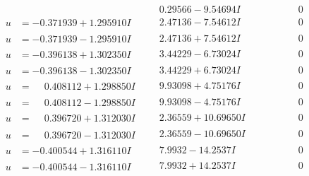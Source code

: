 \documentclass[1p]{elsarticle_modified}
\theoremstyle{definition}
\begin{document}
$$\begin{array}{c|c|c}
 & \phantom{-}0.29566 - 9.54694 I & \phantom{-0.000000 } 0 \\ \hline\begin{aligned}
u &= -0.371939 + 1.295910 I\end{aligned}
 & \phantom{-}2.47136 - 7.54612 I & \phantom{-0.000000 } 0 \\ \hline\begin{aligned}
u &= -0.371939 - 1.295910 I\end{aligned}
 & \phantom{-}2.47136 + 7.54612 I & \phantom{-0.000000 } 0 \\ \hline\begin{aligned}
u &= -0.396138 + 1.302350 I\end{aligned}
 & \phantom{-}3.44229 - 6.73024 I & \phantom{-0.000000 } 0 \\ \hline\begin{aligned}
u &= -0.396138 - 1.302350 I\end{aligned}
 & \phantom{-}3.44229 + 6.73024 I & \phantom{-0.000000 } 0 \\ \hline\begin{aligned}
u &= \phantom{-}0.408112 + 1.298850 I\end{aligned}
 & \phantom{-}9.93098 + 4.75176 I & \phantom{-0.000000 } 0 \\ \hline\begin{aligned}
u &= \phantom{-}0.408112 - 1.298850 I\end{aligned}
 & \phantom{-}9.93098 - 4.75176 I & \phantom{-0.000000 } 0 \\ \hline\begin{aligned}
u &= \phantom{-}0.396720 + 1.312030 I\end{aligned}
 & \phantom{-}2.36559 + 10.69650 I & \phantom{-0.000000 } 0 \\ \hline\begin{aligned}
u &= \phantom{-}0.396720 - 1.312030 I\end{aligned}
 & \phantom{-}2.36559 - 10.69650 I & \phantom{-0.000000 } 0 \\ \hline\begin{aligned}
u &= -0.400544 + 1.316110 I\end{aligned}
 & \phantom{-}7.9932 - 14.2537 I & \phantom{-0.000000 } 0 \\ \hline\begin{aligned}
u &= -0.400544 - 1.316110 I\end{aligned}
 & \phantom{-}7.9932 + 14.2537 I & \phantom{-0.000000 } 0 \\ \hline\begin{aligned}

\end{aligned}
\end{array}$$
\end{document}
